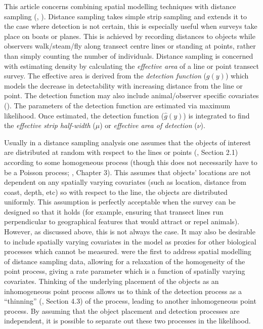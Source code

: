 \documentclass[a4paper,12pt]{article}
\begin{document}
This article concerns combining spatial modelling techniques with distance sampling (\cite{Buckland:2001vm}, \cite{Buckland:2004ts}). Distance sampling takes simple strip sampling and extends it to the case where detection is not certain, this is especially useful when surveys take place on boats or planes. This is achieved by recording distances to objects while observers walk/steam/fly along transect centre lines or standing at points, rather than simply counting the number of individuals. Distance sampling is concerned with estimating density by calculating the \textit{effective area} of a line or point transect survey. The effective area is derived from the \textit{detection function} ($g(y)$) which models the decrease in detectability with increasing distance from the line or point. The detection function may also include animal/observer specific covariates (\cite{Marques:2007vm}). The parameters of the detection function are estimated via maximum likelihood. Once estimated, the detection function ($\hat{g}(y)$) is integrated to find the \textit{effective strip half-width} ($\mu$) or \textit{effective area of detection} ($\nu$). 

Usually in a distance sampling analysis one assumes that the objects of interest are distributed at random with respect to the lines or points (\cite{Buckland:2001vm}, Section 2.1) according to some homogeneous process (though this does not necessarily have to be a Poisson process; \cite{Buckland:2001vm}, Chapter 3). This assumes that objects' locations are not dependent on any spatially varying covariates (such as location, distance from coast, depth, etc) so with respect to the line, the objects are distributed uniformly. This assumption is perfectly acceptable when the survey can be designed so that it holds (for example, ensuring that transect lines run perpendicular to geographical features that would attract or repel animals). However, as discussed above, this is not always the case. It may also be desirable to include spatially varying covariates in the model as proxies for other biological processes which cannot be measured. \cite{Hedley:2004et} were the first to address spatial modelling of distance sampling data, allowing for a relaxation of the homogeneity of the point process, giving a rate parameter which is a function of spatially varying covariates. Thinking of the underlying placement of the objects as an inhomogeneous point process allows us to think of the detection process as a ``thinning'' (\cite{cox1980point}, Section 4.3) of the process, leading to another inhomogeneous point process. By assuming that the object placement and detection processes are independent, it is possible to separate out these two processes in the likelihood.
\end{document}
